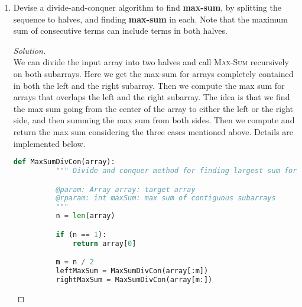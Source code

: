\documentclass[11pt]{article}
\theoremstyle{plain}%
\theoremstyle{definition}
\theoremstyle{remark}
\newenvironment{solution}
  {\begin{proof}[Solution]}
  {\end{proof}}
\newcommand{\N}{\mathbb{N}}
\newcommand{\R}{\mathbb{R}}
\begin{document}
\begin{enumerate}
\begin{solution}
    Now we prove $T_b(n)\in \mathcal{O}(n^2)$,\\
    Let $c_0=7$ and $N_0=1$, let $n\geq N_0$, then
    \begin{align*}
      T_b(n) &= \frac{5}{2}n^2 + \frac{3}{2}n + 3 \\
      &\leq \frac{5}{2}n^2 + \frac{3}{2}n^2 + 3n^2 \tag{$n\geq N_0=1$}\\
      &=c_0n^2 \tag{$c_0=7$}\\
    \end{align*}
    Then $\exists c\in\R, N\in\N, \forall n\geq N, T_b(n) \leq cn^2$. \\
    Hence $T_b(n)\in \mathcal{O}(n^2)$



  \end{solution}

  \item Devise a divide-and-conquer algorithm to find \textbf {max-sum}, by splitting the sequence to halves, and finding \textbf {max-sum} in each. Note that the maximum sum of consecutive terms can include terms in both halves.

  \begin{solution}
    $ $\\
    We can divide the input array into two halves and call \textsc{Max-Sum} recursively on both subarrays. Here we get the max-sum for arrays completely contained in both the left and the right subarray. Then we compute the max sum for arrays that overlaps the left and the right subarray. The idea is that we find the max sum going from the center of the array to either the left or the right side, and then summing the max sum from both sides. Then we compute and return the max sum considering the three cases mentioned above. Details are implemented below.

    \begin{lstlisting}[language=Python]
      def MaxSumDivCon(array):
          """ Divide and conquer method for finding largest sum for contiguous subarrays of positive and negative number array of size n

          @param: Array array: target array
          @rparam: int maxSum: max sum of contiguous subarrays
          """
          n = len(array)

          if (n == 1):
              return array[0]

          m = n / 2
          leftMaxSum = MaxSumDivCon(array[:m])
          rightMaxSum = MaxSumDivCon(array[m:])


\end{lstlisting}
\end{solution}
\end{enumerate}
\end{document}
